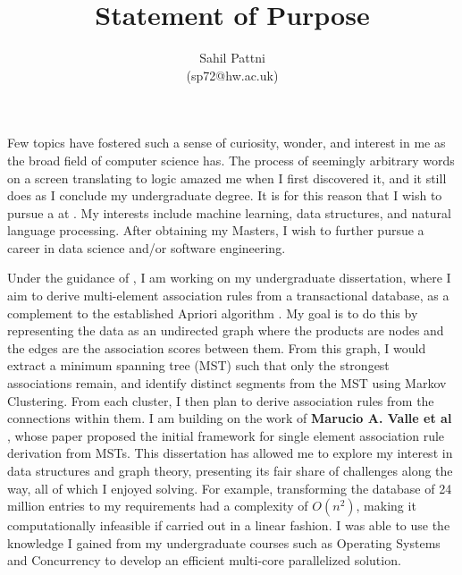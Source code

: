 \documentclass[a4paper,11pt]{article}
\begin{document}
\title{Statement of Purpose}

\author{Sahil Pattni\\(sp72@hw.ac.uk)}
\date{}
\maketitle

Few topics have fostered such a sense of curiosity, wonder, and interest in me as the broad field of computer science has. The process of seemingly arbitrary words on a screen translating to logic amazed me when I first discovered it, and it still does as I conclude my undergraduate degree. It is for this reason that I wish to pursue a \program at \uni. My interests include machine learning, data structures, and natural language processing. After obtaining my Masters, I wish to further pursue a career in data science and/or software engineering.


Under the guidance of \supervisor, I am working on my undergraduate dissertation, where I aim to derive multi-element association rules from a transactional database, as a complement to the established Apriori algorithm \cite{apriori}. My goal is to do this by representing the data as an undirected graph where the products are nodes and the edges are the association scores between them. From this graph, I would extract a minimum spanning tree (MST) such that only the strongest associations remain, and identify distinct segments from the MST using Markov Clustering. From each cluster, I then plan to derive association rules from the connections within them. I am building on the work of \textbf{Marucio A. Valle et al} \cite{mst_paper}, whose paper proposed the initial framework for single element association rule derivation from MSTs. This dissertation has allowed me to explore my interest in data structures and graph theory, presenting its fair share of challenges along the way, all of which I enjoyed solving. For example, transforming the database of 24 million entries to my requirements had a complexity of $O(n^2)$, making it computationally infeasible if carried out in a linear fashion. I was able to use the knowledge I gained from my undergraduate courses such as Operating Systems and Concurrency to develop an efficient multi-core parallelized solution.
\end{document}
